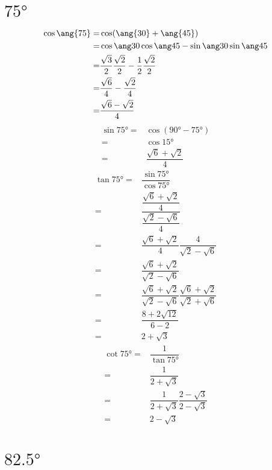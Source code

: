 \section{$\ang{75}$}
\begin{align*}
	\cos\ang{75}=&\cos(\ang{30}+\ang{45})\\
	=&\sumcos{30}{45}\\
	=&\costrenta\cosquarantacinque-\sintrenta\sinquarantecinque\\
	=&\dfrac{\sqrt{6}}{4}-\dfrac{\sqrt{2}}{4}\\
	=&\dfrac{\sqrt{6}-\sqrt{2}}{4}
\end{align*}
\begin{align*}
	\sin\ang{75}=&\cos(\ang{90}-\ang{75})\\
	=&\cos\ang{15}\\
	=&\dfrac{\sqrt{6}+\sqrt{2}}{4}
\end{align*}
\begin{align*}
	\tan\ang{75}=&\dfrac{\sin\ang{75}}{\cos\ang{75}}\\
	=&\dfrac{\dfrac{\sqrt{6}+\sqrt{2}}{4}}{\dfrac{\sqrt{2}-\sqrt{6}}{4}}\\
	=&\dfrac{\sqrt{6}+\sqrt{2}}{4}\dfrac{4}{\sqrt{2}-\sqrt{6}}\\
	=&\dfrac{\sqrt{6}+\sqrt{2}}{\sqrt{2}-\sqrt{6}}\\
	=&\dfrac{\sqrt{6}+\sqrt{2}}{\sqrt{2}-\sqrt{6}}\dfrac{\sqrt{6}+\sqrt{2}}{\sqrt{2}+\sqrt{6}}\\
	=&\dfrac{8+2\sqrt{12}}{6-2}\\
	=&2+\sqrt{3}
\end{align*}
\begin{align*}
	\cot\ang{75}=&\dfrac{1}{\tan\ang{75}}\\
	=&\dfrac{1}{2+\sqrt{3}}\\
	=&\dfrac{1}{2+\sqrt{3}}\dfrac{2-\sqrt{3}}{2-\sqrt{3}}\\
	=&2-\sqrt{3}\\
\end{align*}

\section{$\ang{82.5}$}

